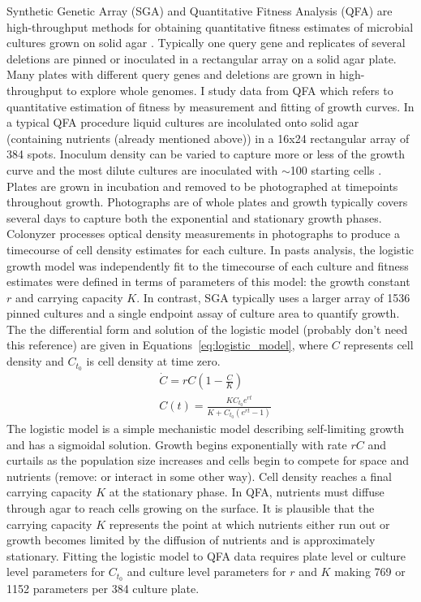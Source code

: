 Synthetic Genetic Array (SGA) and Quantitative Fitness Analysis (QFA)
are high-throughput methods for obtaining quantitative fitness
estimates of microbial cultures grown on solid agar
\citep{Baryshnikova2010sga,Banks2012}. Typically one query gene and
replicates of several deletions are pinned or inoculated in a
rectangular array on a solid agar plate. Many plates with different
query genes and deletions are grown in high-throughput to explore
whole genomes. I study data from QFA which refers to quantitative
estimation of fitness by measurement and fitting of growth curves. In
a typical QFA procedure liquid cultures are incolulated onto solid
agar (containing nutrients (already mentioned above)) in a 16x24
rectangular array of 384 spots. Inoculum density can be varied to
capture more or less of the growth curve and the most dilute cultures
are inoculated with \(\sim\)100 starting cells
\citep{Addinall2011}. Plates are grown in incubation and removed to be
photographed at timepoints throughout growth. Photographs are of whole
plates and growth typically covers several days to capture both the
exponential and stationary growth phases. Colonyzer
\citep{Lawless2010} processes optical density measurements in
photographs to produce a timecourse of cell density estimates for each
culture. In pasts analysis, the logistic growth model was
independently fit to the timecourse of each culture and fitness
estimates were defined in terms of parameters of this model: the
growth constant \(r\) and carrying capacity \(K\). In contrast, SGA
typically uses a larger array of 1536 pinned cultures and a single
endpoint assay of culture area to quantify growth. The the
differential form and solution of the logistic model
\citep{Verhulst1845} (probably don't need this reference) are given in
Equations~\ref{eq:logistic_model}, where \(C\) represents cell density
and \(C_{t_{0}}\) is cell density at time zero.
\begin{subequations}
  \label{eq:logistic_model}
  \begin{align}
    &\dot{C} = rC\left(1 - \frac{C}{K}\right)\\
    &C(t) = \frac{KC_{t_{0}}e^{rt}}{K + C_{t_{0}}(e^{rt}-1)}
  \end{align}
\end{subequations}
%
The logistic model is a simple mechanistic model describing
self-limiting growth and has a sigmoidal solution. Growth begins
exponentially with rate \(rC\) and curtails as the population size
increases and cells begin to compete for space and nutrients (remove:
or interact in some other way). Cell density reaches a final carrying
capacity \(K\) at the stationary phase. In QFA, nutrients must diffuse
through agar to reach cells growing on the surface. It is plausible
that the carrying capacity \(K\) represents the point at which
nutrients either run out or growth becomes limited by the diffusion of
nutrients and is approximately stationary. Fitting the logistic model
to QFA data requires plate level or culture level parameters for
\(C_{t_{0}}\) and culture level parameters for \(r\) and \(K\) making
769 or 1152 parameters per 384 culture plate.

